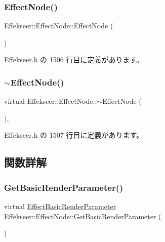 \subsubsection{\texorpdfstring{Effect\+Node()}{EffectNode()}}
{\footnotesize\ttfamily Effekseer\+::\+Effect\+Node\+::\+Effect\+Node (\begin{DoxyParamCaption}{ }\end{DoxyParamCaption})\hspace{0.3cm}{\ttfamily [inline]}}



 Effekseer.\+h の 1506 行目に定義があります。

\mbox{\label{class_effekseer_1_1_effect_node_a3f6d7251ef627dc4fa86e45c57989741}} 
\subsubsection{\texorpdfstring{$\sim$\+Effect\+Node()}{~EffectNode()}}
{\footnotesize\ttfamily virtual Effekseer\+::\+Effect\+Node\+::$\sim$\+Effect\+Node (\begin{DoxyParamCaption}{ }\end{DoxyParamCaption})\hspace{0.3cm}{\ttfamily [inline]}, {\ttfamily [virtual]}}



 Effekseer.\+h の 1507 行目に定義があります。



\subsection{関数詳解}
\mbox{\label{class_effekseer_1_1_effect_node_a5066e8209dabdcab46eb5fb64de5180d}} 
\subsubsection{\texorpdfstring{Get\+Basic\+Render\+Parameter()}{GetBasicRenderParameter()}}
{\footnotesize\ttfamily virtual \mbox{\hyperlink{struct_effekseer_1_1_effect_basic_render_parameter}{Effect\+Basic\+Render\+Parameter}} Effekseer\+::\+Effect\+Node\+::\+Get\+Basic\+Render\+Parameter (\begin{DoxyParamCaption}{ }\end{DoxyParamCaption})\hspace{0.3cm}{\ttfamily [pure virtual]}}



